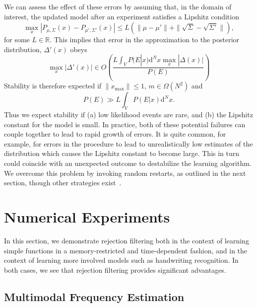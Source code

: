 \documentclass{article} %
\begin{document}
We can assess the effect of these errors by assuming that, in the domain of interest, the updated model after an experiment satisfies a Lipshitz condition
\begin{equation}
\max_x|P_{\mu,\Sigma}(x) - P_{\mu' ,\Sigma'}(x)| \le L(\|\mu- \mu'\| +\|\sqrt{\Sigma}- \sqrt{\Sigma'}\|),
\end{equation}
for some $L\in \mathbb{R}$.  This implies that error in the approximation to the posterior distribution, $\Delta'(x)$ obeys
\begin{equation}
\max_x |\Delta'(x)| \in O\left( \frac{L\int_V P(E|x) \mathrm{d}^Nx \max_x |\Delta(x)|}{P(E)}\right)
\end{equation}
Stability is therefore expected if $\|x_{\max}\|\le 1$, $m\in \Omega(N^2)$ and
\begin{equation}
P(E) \gg {L\int_V P(E|x) \mathrm{d}^Nx }.
\end{equation}
Thus we expect stability if (a) low likelihood events are rare, and (b) the Lipshitz constant for the model is small.  In practice, both of these potential failures can couple together to lead to rapid growth of errors.  It is quite common, for example, for errors in the procedure to lead to unrealistically low estimates of the distribution which causes the Lipshitz constant to become large.  This in turn could coincide with an unexpected outcome to destabilize the learning algorithm. 
We overcome this problem by invoking random restarts, as outlined in the next section,
though other strategies exist~\cite{wiebe_efficient_2015}.


\section{Numerical Experiments}
\label{sec:numerical-experiments}

In this section, we demonstrate rejection filtering both in the context of
learning simple functions in a memory-restricted and time-dependent fashion,
and in the context of learning more involved models such as handwriting
recognition. In both cases, we see that rejection filtering provides significant
advantages.

\subsection{Multimodal Frequency Estimation}
\end{document}
